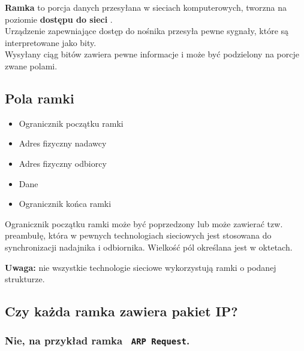 \documentclass[../sk-egzamin.tex]{subfiles}
\begin{document}

\textbf{Ramka} to porcja danych przesyłana w sieciach komputerowych, tworzna
na poziomie \textbf{dostępu do sieci} .\\
Urządzenie zapewniające dostęp do nośnika przesyła pewne sygnały, które są
interpretowane jako bity.\\
Wysyłany ciąg bitów zawiera pewne informacje i może być podzielony na porcje
zwane polami.

\subsection*{Pola ramki}
\begin{itemize}
    \item Ogranicznik początku ramki 
    \item Adres fizyczny nadawcy 
    \item Adres fizyczny odbiorcy 
    \item Dane
    \item Ogranicznik końca ramki 
\end{itemize}

Ogranicznik początku ramki może być poprzedzony lub może zawierać tzw.
preambułę, która w pewnych technologiach sieciowych jest stosowana do
synchronizacji nadajnika i odbiornika. Wielkość pól określana jest w oktetach.

\textbf{Uwaga:} nie wszystkie technologie sieciowe wykorzystują ramki o podanej
strukturze.

\subsection*{Czy każda ramka zawiera pakiet IP?}
\subsubsection*{Nie, na przykład ramka \texttt{ ARP Request}.}

\pagebreak
\end{document}

